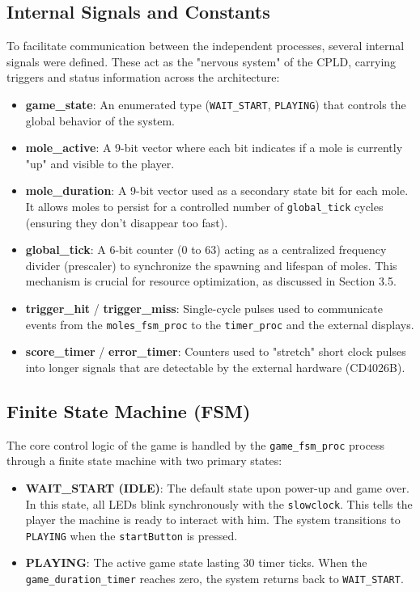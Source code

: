 \documentclass[12pt,a4paper]{article}
\begin{document}
\subsection{Internal Signals and Constants}
To facilitate communication between the independent processes, several internal signals were defined. These act as the "nervous system" of the CPLD, carrying triggers and status information across the architecture:

\begin{itemize}
    \item \textbf{game\_state}: An enumerated type (\texttt{WAIT\_START}, \texttt{PLAYING}) that controls the global behavior of the system.
    \item \textbf{mole\_active}: A 9-bit vector where each bit indicates if a mole is currently "up" and visible to the player.
    \item \textbf{mole\_duration}: A 9-bit vector used as a secondary state bit for each mole. It allows moles to persist for a controlled number of \texttt{global\_tick} cycles (ensuring they don't disappear too fast).
    \item \textbf{global\_tick}: A 6-bit counter (0 to 63) acting as a centralized frequency divider (prescaler) to synchronize the spawning and lifespan of moles. This mechanism is crucial for resource optimization, as discussed in Section 3.5.
    \item \textbf{trigger\_hit} / \textbf{trigger\_miss}: Single-cycle pulses used to communicate events from the \texttt{moles\_fsm\_proc} to the \texttt{timer\_proc} and the external displays.
    \item \textbf{score\_timer} / \textbf{error\_timer}: Counters used to "stretch" short clock pulses into longer signals that are detectable by the external hardware (CD4026B).
\end{itemize}

\subsection{Finite State Machine (FSM)}
The core control logic of the game is handled by the \texttt{game\_fsm\_proc} process through a finite state machine with two primary states:
\begin{itemize}
    \item \textbf{WAIT\_START (IDLE)}: The default state upon power-up and game over. In this state, all LEDs blink synchronously with the \texttt{slowclock}. This tells the player the machine is ready to interact with him.  The system transitions to \texttt{PLAYING} when the \texttt{startButton} is pressed.
    \item \textbf{PLAYING}: The active game state lasting 30 timer ticks. When the \texttt{game\_duration\_timer} reaches zero, the system returns back to \texttt{WAIT\_START}.
\end{itemize}
\end{document}
